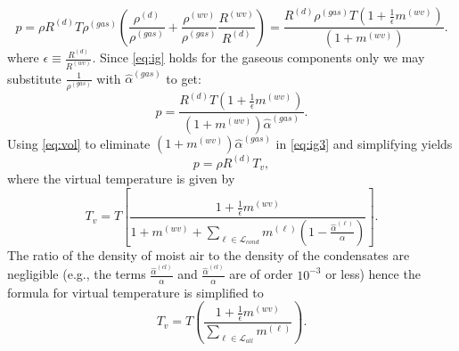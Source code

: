 \documentclass{agujournal}
\begin{document}
\begin{equation}
p=\rho R^{(d)} T\rho^{(gas)}\left( \frac{\rho^{(d)}}{\rho^{(gas)}}+\frac{\rho^{(wv)}}{\rho^{(gas)}}\frac{R^{(wv)}}{R^{(d)}}\right)=\frac{R^{(d)} \rho^{(gas)}T\left( 1+\frac{1}{\epsilon}m^{(wv)}\right)}{\left(1+m^{(wv)}\right)}\label{eq:ig2}.
\end{equation}
where $\epsilon\equiv \frac{R^{(d)}}{R^{(wv)}}$. Since \eqref{eq:ig} holds for the gaseous components only we may substitute $\frac{1}{\rho^{(gas)}}$ with $\hat{\alpha}^{(gas)}$ to get:
\begin{equation}
p=\frac{R^{(d)} T\left( 1+\frac{1}{\epsilon}m^{(wv)}\right)}{\left(1+m^{(wv)}\right)\hat{\alpha}^{(gas)}}\label{eq:ig3}.
\end{equation}
Using \eqref{eq:vol} to eliminate $\left(1+m^{(wv)}\right)\hat{\alpha}^{(gas)}$ in \eqref{eq:ig3} and simplifying yields
\begin{equation}
p=\rho R^{(d)} T_v\label{eq:igl},
\end{equation}
where the virtual temperature is given by
\begin{equation}
T_v =T\left[ \frac{1+\frac{1}{\epsilon}m^{(wv)}}{1+m^{(wv)}+\sum_{\ell\in \mathcal{L}_{cond}}m^{(\ell)}\left(1-\frac{\hat{\alpha}^{(\ell)}}{\alpha}\right)}\right].
\end{equation}
The ratio of the density of moist air to the density of the condensates are negligible (e.g., the terms $\frac{\hat{\alpha}^{(cl)}}{\alpha}$ and $\frac{\hat{\alpha}^{(cl)}}{\alpha}$ are of order $10^{-3}$ or less) hence the formula for virtual temperature is simplified to
\begin{equation}
T_v =T\left( \frac{1+\frac{1}{\epsilon}m^{(wv)}}{\sum_{\ell \in \mathcal{L}_{all}}m^{(\ell)}}\right).\label{eq:tv}
\end{equation}
\end{document}

